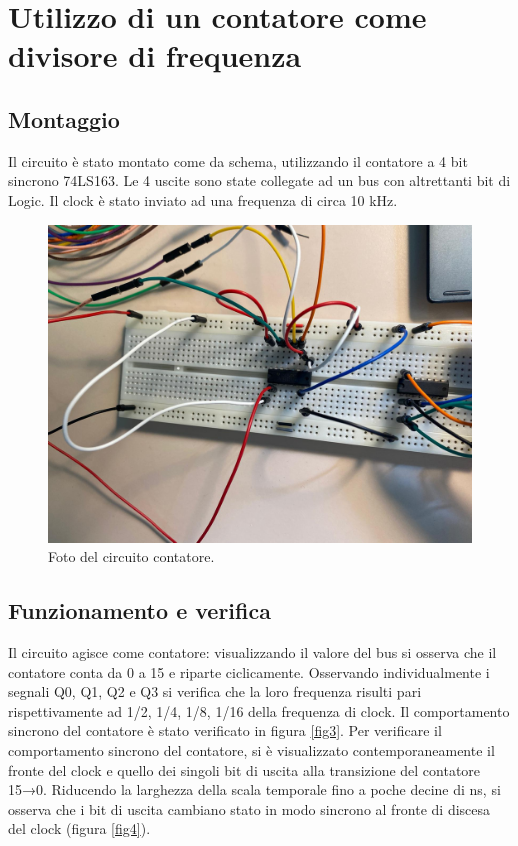 \documentclass[10pt,a4paper]{article}
\begin{document}
\section{Utilizzo di un contatore come divisore di frequenza}
\subsection{Montaggio}
Il circuito è stato montato come da schema, utilizzando il contatore a 4 bit sincrono 74LS163. Le 4 uscite sono state collegate ad un bus con altrettanti bit di Logic. Il clock è stato inviato ad una frequenza di circa 10 kHz. 

\begin{figure}[htp]
\begin{center}
\includegraphics[scale=0.25]{circuito3.jpeg}
\caption{Foto del circuito contatore.}
\end{center}
\end{figure}

\subsection{Funzionamento e verifica}
Il circuito agisce come contatore: visualizzando il valore del bus si osserva che il contatore conta da 0 a 15 e riparte ciclicamente. Osservando individualmente i segnali Q0, Q1, Q2 e Q3 si verifica che la loro frequenza risulti pari rispettivamente ad 1/2, 1/4, 1/8, 1/16 della frequenza di clock. Il comportamento sincrono del contatore è stato verificato in figura \ref{fig3}. 
Per verificare il comportamento sincrono del contatore, si è visualizzato contemporaneamente il fronte del clock e quello dei singoli bit di uscita alla transizione del contatore 15→0. Riducendo la larghezza della scala temporale fino a poche decine di ns, si osserva che i bit di uscita cambiano stato in modo sincrono al fronte di discesa del clock (figura \ref{fig4}).
\end{document}
